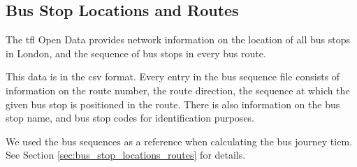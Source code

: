 \subsection{Bus Stop Locations and Routes}
\par The \acrshort{tfl} Open Data provides network information on the location of all bus stops in London, and the sequence of bus stops in every bus route.

\par This data is in the \acrfull{csv} format. Every entry in the bus sequence file consists of information on the route number, the route direction, the sequence at which the given bus stop is positioned in the route. There is also information on the bus stop name, and bus stop codes for identification purposes.

\par We used the bus sequences as a reference when calculating the bus journey tiem. See Section \ref{sec:bus_stop_locations_routes} for details.
